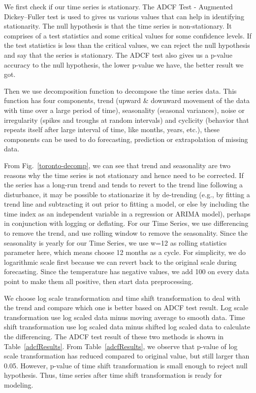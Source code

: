 \documentclass[runningheads]{llncs}
\begin{document}
We first check if our time series is stationary. The ADCF Test - Augmented Dickey–Fuller test is used to gives us various values that can help in identifying stationarity. The null hypothesis is that the time series is non-stationary. It comprises of a test statistics and some critical values for some confidence levels. If the test statistics is less than the critical values, we can reject the null hypothesis and say that the series is stationary. The ADCF test also gives us a p-value accuracy to the null hypothesis, the lower p-value we have, the better result we got.

Then we use decomposition function to decompose the time series data. This function has four components, trend (upward \& downward movement of the data with time over a large period of time), seasonality (seasonal variances), noise or irregularity (spikes and troughs at random intervals) and cyclicity (behavior that repeats itself after large interval of time, like months, years, etc.), these components can be used to do forecasting, prediction or extrapolation of missing data.

From Fig.~\ref{toronto-decomp}, we can see that trend and seasonality are two reasons why the time series is not stationary and hence need to be corrected. If the series has a long-run trend and tends to revert to the trend line following a disturbance, it may be possible to stationarize it by de-trending (e.g., by fitting a trend line and subtracting it out prior to fitting a model, or else by including the time index as an independent variable in a regression or ARIMA model), perhaps in conjunction with logging or deflating. For our Time Series, we use differencing to remove the trend, and use rolling window to remove the seasonality. Since the seasonality is yearly for our Time Series, we use w=12 as rolling statistics parameter here, which means choose 12 months as a cycle. For simplicity, we do logarithmic scale first because we can revert back to the original scale during forecasting. Since the temperature has negative values, we add 100 on every data point to make them all positive, then start data preprocessing.

We choose log scale transformation and time shift transformation to deal with the trend and compare which one is better based on ADCF test result. Log scale transformation use log scaled data minus moving average to smooth data. Time shift transformation use log scaled data minus shifted log scaled data to calculate the differencing. The ADCF test result of these two methods is shown in Table~\ref{adcfResults}. From Table~\ref{adcfResults}, we observe that p-value of log scale transformation has reduced compared to original value, but still larger than 0.05. However, p-value of time shift transformation is small enough to reject null hypothesis. Thus, time series after time shift transformation is ready for modeling.
\end{document}
